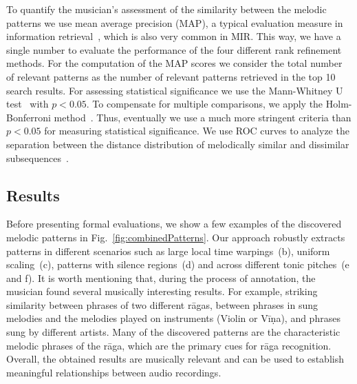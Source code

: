 To quantify the musician's assessment of the similarity between the melodic patterns  we use mean average precision (MAP), a typical evaluation measure in information retrieval~\cite{manning2008introduction}, which is also very common in MIR. This way, we have a single number to evaluate the performance of the four different rank refinement methods. For the computation of the MAP scores we consider the total number of relevant patterns as the number of relevant patterns retrieved in the top 10 search results.  For assessing statistical significance we use the Mann-Whitney U test~\cite{mann1947test} with $p < 0.05$. To compensate for multiple comparisons, we apply the Holm-Bonferroni method~\cite{holm1979simple}. Thus, eventually we use a much more stringent criteria than $p < 0.05$ for measuring statistical significance. We use ROC curves to analyze the separation between the distance distribution of melodically similar and dissimilar subsequences~\cite{manning2008introduction}. 

\subsection{Results}



Before presenting formal evaluations, we show a few examples of the discovered melodic patterns in Fig.~\ref{fig:combinedPatterns}. Our approach robustly extracts patterns in different scenarios such as large local time warpings~(b), uniform scaling~(c), patterns with silence regions~(d) and across different tonic pitches~(e and f). It is worth mentioning that, during the process of annotation, the musician found several musically interesting results. For example, striking similarity between phrases of two different r\={a}gas, between phrases in sung melodies and the melodies played on instruments (Violin or V\={i}\d{n}a), and phrases sung by different artists. Many of the discovered patterns are the characteristic melodic phrases of the r\={a}ga, which are the primary cues for r\={a}ga recognition. Overall, the  obtained results are musically relevant and can be used to establish meaningful relationships between audio recordings.

